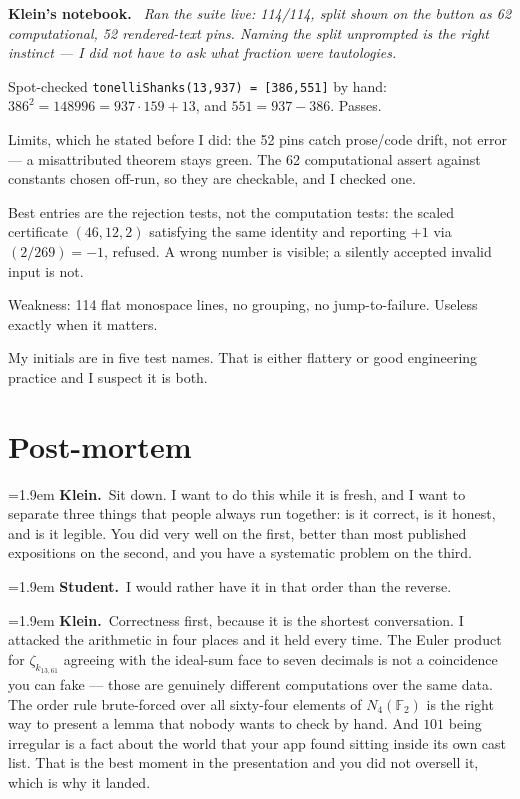 \documentclass[11pt]{article}
\newcommand{\Stu}[1]{\par\smallskip\noindent\hangindent=1.9em\hangafter=1%
  \textcolor{stucol}{\textbf{Student.}}~#1\par}
\newcommand{\Kle}[1]{\par\smallskip\noindent\hangindent=1.9em\hangafter=1%
  \textcolor{klecol}{\textbf{Klein.}}~#1\par}
\newcommand{\walkbeat}[1]{\par\smallskip{\centering\small\itshape\textcolor{beatgray}{#1}\par}\smallskip}
\newenvironment{knote}%
  {\begin{snugshade}\small\noindent\textbf{\textcolor{klecol}{Klein's notebook.}}\itshape\ }%
  {\end{snugshade}}
\begin{document}
\begin{knote}
Ran the suite live: 114/114, split shown on the button as 62 computational, 52 rendered-text pins. Naming the split unprompted is the right instinct --- I did not have to ask what fraction were tautologies.

Spot-checked \texttt{tonelliShanks(13,937) = [386,551]} by hand: $386^2 = 148996 = 937 \cdot 159 + 13$, and $551 = 937 - 386$. Passes.

Limits, which he stated before I did: the 52 pins catch prose/code drift, not error --- a misattributed theorem stays green. The 62 computational assert against constants chosen off-run, so they are checkable, and I checked one.

Best entries are the rejection tests, not the computation tests: the scaled certificate $(46,12,2)$ satisfying the same identity and reporting $+1$ via $(2/269) = -1$, refused. A wrong number is visible; a silently accepted invalid input is not.

Weakness: 114 flat monospace lines, no grouping, no jump-to-failure. Useless exactly when it matters.

My initials are in five test names. That is either flattery or good engineering practice and I suspect it is both.
\end{knote}\clearpage
\section*{Post-mortem}

\walkbeat{The laptop is closed. Klein has his notebook open on the table and is going back through it with a pen, not turning pages in order.}

\Kle{Sit down. I want to do this while it is fresh, and I want to separate three things that people always run together: is it correct, is it honest, and is it legible. You did very well on the first, better than most published expositions on the second, and you have a systematic problem on the third.}

\Stu{I would rather have it in that order than the reverse.}

\Kle{Correctness first, because it is the shortest conversation. I attacked the arithmetic in four places and it held every time. The Euler product for $\zeta_{k_{13,61}}$ agreeing with the ideal-sum face to seven decimals is not a coincidence you can fake --- those are genuinely different computations over the same data. The order rule brute-forced over all sixty-four elements of $N_4(\mathbb{F}_2)$ is the right way to present a lemma that nobody wants to check by hand. And $101$ being irregular is a fact about the world that your app found sitting inside its own cast list. That is the best moment in the presentation and you did not oversell it, which is why it landed.}
\end{document}
